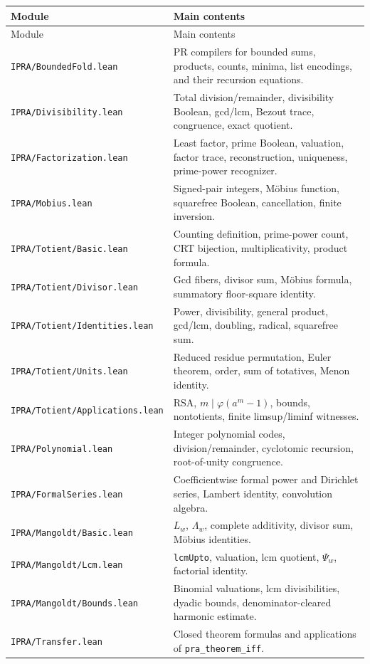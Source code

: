 \documentclass[11pt]{article}
\theoremstyle{definition}
\newcommand{\code}[1]{\nolinkurl{#1}}
\begin{document}
\begin{longtable}{@{}>{\raggedright\arraybackslash}p{}>{\raggedright\arraybackslash}p{}@{}}
\toprule
Module & Main contents \\
\midrule
\endfirsthead
\toprule Module & Main contents \\
\midrule
\endhead
\code{IPRA/BoundedFold.lean} & PR compilers for bounded sums, products, counts, minima, list encodings, and their recursion equations.\\
\code{IPRA/Divisibility.lean} & Total division/remainder, divisibility Boolean, gcd/lcm, Bezout trace, congruence, exact quotient.\\
\code{IPRA/Factorization.lean} & Least factor, prime Boolean, valuation, factor trace, reconstruction, uniqueness, prime-power recognizer.\\
\code{IPRA/Mobius.lean} & Signed-pair integers, M\"obius function, squarefree Boolean, cancellation, finite inversion.\\
\code{IPRA/Totient/Basic.lean} & Counting definition, prime-power count, CRT bijection, multiplicativity, product formula.\\
\code{IPRA/Totient/Divisor.lean} & Gcd fibers, divisor sum, M\"obius formula, summatory floor-square identity.\\
\code{IPRA/Totient/Identities.lean} & Power, divisibility, general product, gcd/lcm, doubling, radical, squarefree sum.\\
\code{IPRA/Totient/Units.lean} & Reduced residue permutation, Euler theorem, order, sum of totatives, Menon identity.\\
\code{IPRA/Totient/Applications.lean} & RSA, \(m\mid\varphi(a^m-1)\), bounds, nontotients, finite limsup/liminf witnesses.\\
\code{IPRA/Polynomial.lean} & Integer polynomial codes, division/remainder, cyclotomic recursion, root-of-unity congruence.\\
\code{IPRA/FormalSeries.lean} & Coefficientwise formal power and Dirichlet series, Lambert identity, convolution algebra.\\
\code{IPRA/Mangoldt/Basic.lean} & \(L_w\), \(\Lambda_w\), complete additivity, divisor sum, M\"obius identities.\\
\code{IPRA/Mangoldt/Lcm.lean} & \code{lcmUpto}, valuation, lcm quotient, \(\Psi_w\), factorial identity.\\
\code{IPRA/Mangoldt/Bounds.lean} & Binomial valuations, lcm divisibilities, dyadic bounds, denominator-cleared harmonic estimate.\\
\code{IPRA/Transfer.lean} & Closed theorem formulas and applications of \code{pra\_theorem\_iff}.\\
\bottomrule
\end{longtable}
\end{document}
